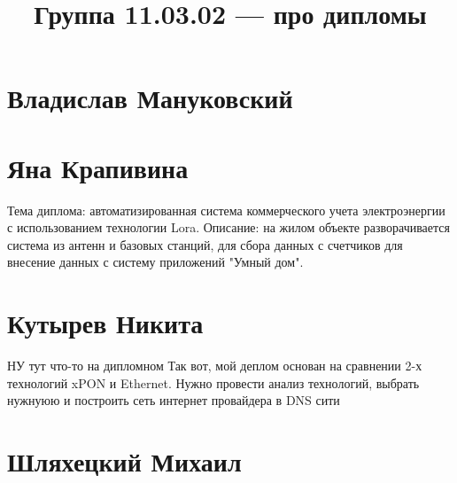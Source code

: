 \documentclass{article}
\title{Группа 11.03.02 --- про дипломы}
\begin{document}
\section*{Владислав Мануковский}

\section*{Яна Крапивина}
Тема диплома: автоматизированная система коммерческого учета электроэнергии с использованием технологии Lora.
Описание: на жилом объекте разворачивается система из антенн и базовых станций, для сбора данных с счетчиков для внесение данных с систему приложений "Умный дом".

\section*{Кутырев Никита}
НУ тут что-то на дипломном
Так вот, мой деплом основан на сравнении 2-х технологий xPON и Ethernet. Нужно провести анализ технологий, выбрать нужнуюю и построить сеть интернет провайдера в DNS сити
\section*{Шляхецкий Михаил}
\end{document}
